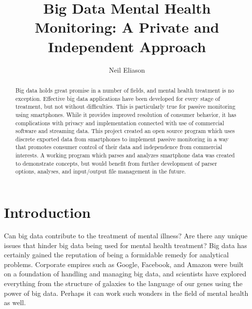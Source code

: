 \documentclass[sigconf]{acmart}
\begin{document}
\title{Big Data Mental Health Monitoring: A Private and Independent Approach}


\author{Neil Eliason}

\renewcommand{\shortauthors}{N. Eliason}


\begin{abstract}

Big data holds great promise in a number of fields, and mental health treatment is no exception. Effective big data applications have been developed for every stage of treatment, but not without difficulties. This is particularly true for passive monitoring using smartphones. While it provides improved resolution of consumer behavior, it has complications with privacy and implementation connected with use of commercial software and streaming data. This project created an open source program which uses discrete exported data from smartphones to implement passive monitoring in a way that promotes consumer control of their data and independence from commercial interests. A working program which parses and analyzes smartphone data was created to demonstrate concepts, but would benefit from further development of parser options, analyses, and input/output file management in the future.

\end{abstract}



\maketitle

\section{Introduction}

Can big data contribute to the treatment of mental illness? Are there any unique issues that hinder big data being used for mental health treatment? Big data has certainly gained the reputation of being a formidable remedy for analytical problems. Corporate empires such as Google, Facebook, and Amazon were built on a foundation of handling and managing big data, and scientists have explored everything from the structure of galaxies to the language of our genes using the power of big data. Perhaps it can work such wonders in the field of mental health as well.
\end{document}
